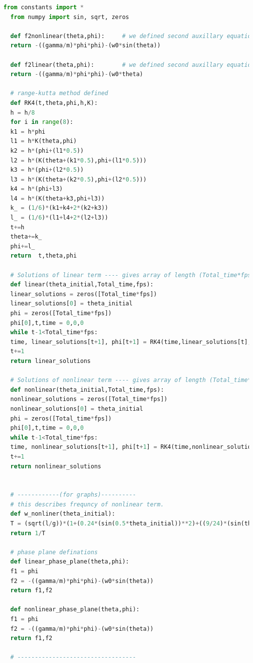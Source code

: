 \documentclass[11pt,a4paper]{article}
\begin{document}
\begin{lstlisting}[language=Python]
  from constants import *
  from numpy import sin, sqrt, zeros

  def f2nonlinear(theta,phi):     # we defined second auxillary equation from nonlinear term.
  return -((gamma/m)*phi*phi)-(w0*sin(theta))

  def f2linear(theta,phi):        # we defined second auxillary equation from linear term.
  return -((gamma/m)*phi*phi)-(w0*theta)

  # range-kutta method defined
  def RK4(t,theta,phi,h,K): 
  h = h/8
  for i in range(8):
  k1 = h*phi
  l1 = h*K(theta,phi)
  k2 = h*(phi+(l1*0.5))
  l2 = h*(K(theta+(k1*0.5),phi+(l1*0.5)))
  k3 = h*(phi+(l2*0.5))
  l3 = h*(K(theta+(k2*0.5),phi+(l2*0.5)))
  k4 = h*(phi+l3)
  l4 = h*(K(theta+k3,phi+l3))
  k_ = (1/6)*(k1+k4+2*(k2+k3))
  l_ = (1/6)*(l1+l4+2*(l2+l3))
  t+=h
  theta+=k_
  phi+=l_
  return  t,theta,phi

  # Solutions of linear term ---- gives array of length (Total_time*fps)
  def linear(theta_initial,Total_time,fps):
  linear_solutions = zeros([Total_time*fps])
  linear_solutions[0] = theta_initial
  phi = zeros([Total_time*fps])
  phi[0],t,time = 0,0,0
  while t-1<Total_time*fps:
  time, linear_solutions[t+1], phi[t+1] = RK4(time,linear_solutions[t],phi[t],1/fps,f2linear)
  t+=1
  return linear_solutions

  # Solutions of nonlinear term ---- gives array of length (Total_time*fps)
  def nonlinear(theta_initial,Total_time,fps):
  nonlinear_solutions = zeros([Total_time*fps])
  nonlinear_solutions[0] = theta_initial
  phi = zeros([Total_time*fps])
  phi[0],t,time = 0,0,0
  while t-1<Total_time*fps:
  time, nonlinear_solutions[t+1], phi[t+1] = RK4(time,nonlinear_solutions[t],phi[t],1/fps,f2nonlinear)
  t+=1
  return nonlinear_solutions


  # ------------(for graphs)----------
  # this describes frequncy of nonlinear term.
  def w_nonliner(theta_initial):
  T = (sqrt(l/g))*(1+(0.24*(sin(0.5*theta_initial))**2)+((9/24)*(sin(theta_initial*0.5))**4))
  return 1/T

  # phase plane definations
  def linear_phase_plane(theta,phi):
  f1 = phi
  f2 = -((gamma/m)*phi*phi)-(w0*sin(theta))
  return f1,f2

  def nonlinear_phase_plane(theta,phi):
  f1 = phi
  f2 = -((gamma/m)*phi*phi)-(w0*sin(theta))
  return f1,f2

  # ----------------------------------

\end{lstlisting}
\end{document}
